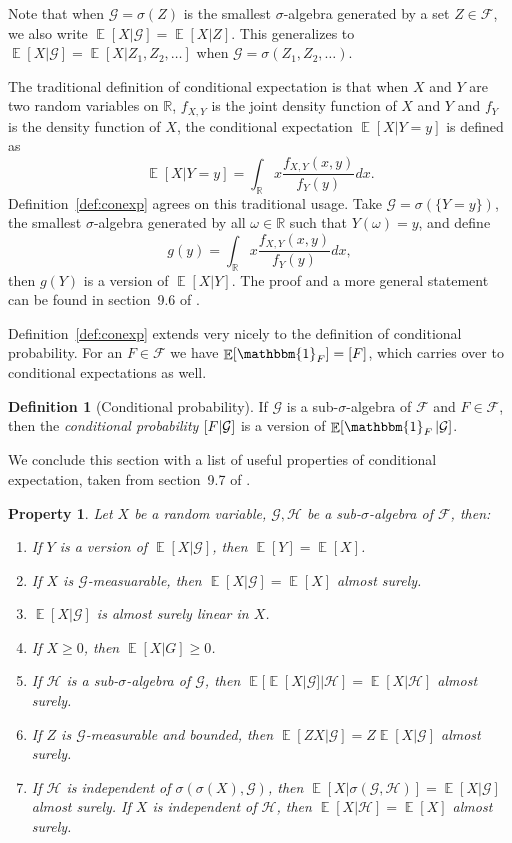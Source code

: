 \documentclass[twoside,a4paper]{report}
\theoremstyle{plain}
\newtheorem{property}[theorem]{Property}
\theoremstyle{definition}
\newtheorem{definition}[theorem]{Definition}
\theoremstyle{remark}
\numberwithin{equation}{chapter}
\newcommand{\R}{\mathbb{R}}
\let\P\relax
\DeclareMathOperator{\P}{\mathbb{P}}
\DeclareMathOperator{\E}{\mathbb{E}}
\DeclareMathOperator{\1}{\mathbbm{1}}
\newcommand{\F}{\mathcal{F}}
\renewcommand{\G}{\mathcal{G}}
\renewcommand{\H}{\mathcal{H}}
\begin{document}
Note that when $\G=\sigma(Z)$ is the smallest $\sigma$-algebra generated by a set $Z\in\F$, we also write $\E[X|\G]=\E[X|Z]$. This generalizes to $\E[X|\G]=\E[X|Z_1,Z_2,\ldots]$ when $\G=\sigma(Z_1,Z_2,\ldots)$.

The traditional definition of conditional expectation is that when $X$ and $Y$ are two random variables on $\R$, $f_{X,Y}$ is the joint density function of $X$ and $Y$ and $f_Y$ is the density function of $X$, the conditional expectation $\E[X|Y=y]$ is defined as
\begin{equation}
\E[X|Y=y]=\int_\R x\frac{f_{X,Y}(x,y)}{f_Y(y)}dx.
\end{equation}
Definition~\ref{def:conexp} agrees on this traditional usage. Take $\G=\sigma(\{Y=y\})$, the smallest $\sigma$-algebra generated by all $\omega\in\R$ such that $Y(\omega)=y$, and define
\begin{equation}
g(y)=\int_\R x\frac{f_{X,Y}(x,y)}{f_Y(y)}dx,
\end{equation}
then $g(Y)$ is a version of $\E[X|Y]$. The proof and a more general statement can be found in section~9.6 of \cite{Williams91}.

Definition~\ref{def:conexp} extends very nicely to the definition of conditional probability. For an $F\in\F$ we have $\E[\1_F]=\P[F]$, which carries over to conditional expectations as well.

\begin{definition}[Conditional probability]
If $\G$ is a sub-$\sigma$-algebra of $\F$ and $F\in\F$, then the \emph{conditional probability} $\P[F|\G]$ is a version of $\E[\1_F|\G]$.
\end{definition}

We conclude this section with a list of useful properties of conditional expectation, taken from section~9.7 of \cite{Williams91}.

\begin{property}\label{property:expcon}
Let $X$ be a random variable, $\G,\H$ be a sub-$\sigma$-algebra of $\F$, then:
\begin{enumerate}
\item If $Y$ is a version of $\E[X|\G]$, then $\E[Y]=\E[X]$.
\item If $X$ is $\G$-measuarable, then $\E[X|\G]=\E[X]$ almost surely.
\item $\E[X|\G]$ is almost surely linear in $X$.
\item If $X\geq 0$, then $\E[X|G]\geq 0$.
\item If $\H$ is a sub-$\sigma$-algebra of $\G$, then $\E[\E[X|\G]|\H]=\E[X|\H]$ almost surely.
\item If $Z$ is $\G$-measurable and bounded, then $\E[ZX|\G]=Z\E[X|\G]$ almost surely.
\item If $\H$ is independent of $\sigma(\sigma(X),\G)$, then $\E[X|\sigma(\G,\H)]=\E[X|\G]$ almost surely. If $X$ is independent of $\H$, then $\E[X|\H]=\E[X]$ almost surely.
\end{enumerate}
\end{property}
\end{document}
